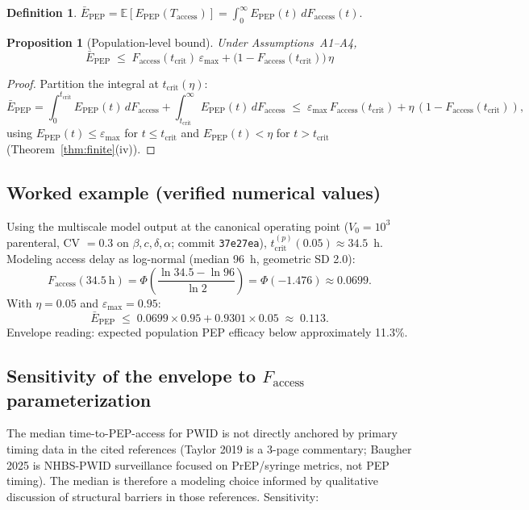 \documentclass[11pt]{article}
\newtheorem{proposition}{Proposition}[section]
\theoremstyle{definition}
\newtheorem{definition}{Definition}[section]
\theoremstyle{remark}
\newcommand{\Epep}{E_{\text{PEP}}}
\newcommand{\Ebarpep}{\bar{E}_{\text{PEP}}}
\newcommand{\Faccess}{F_{\text{access}}}
\newcommand{\tcrit}{t_{\text{crit}}}
\newcommand{\emax}{\varepsilon_{\max}}
\begin{document}
\begin{definition}
$\Ebarpep = \mathbb{E}[\Epep(T_{\text{access}})] = \int_{0}^{\infty} \Epep(t)\,d\Faccess(t)$.
\end{definition}

\begin{proposition}[Population-level bound]\label{prop:bound}
Under Assumptions~A1--A4,
\begin{equation}
\Ebarpep \;\leq\; \Faccess(\tcrit)\,\emax + \big(1 - \Faccess(\tcrit)\big)\,\eta
\label{eq:bound_si}
\end{equation}
\end{proposition}

\begin{proof}
Partition the integral at $\tcrit(\eta)$:
\[
\Ebarpep = \int_{0}^{\tcrit} \Epep(t)\,d\Faccess + \int_{\tcrit}^{\infty} \Epep(t)\,d\Faccess
\;\leq\; \emax\,\Faccess(\tcrit) + \eta\,(1 - \Faccess(\tcrit)),
\]
using $\Epep(t) \leq \emax$ for $t \leq \tcrit$ and $\Epep(t) < \eta$ for $t > \tcrit$ (Theorem~\ref{thm:finite}(iv)).
\end{proof}

\subsection{Worked example (verified numerical values)}

Using the multiscale model output at the canonical operating point ($V_{0} = 10^{3}$ parenteral, CV $= 0.3$ on $\beta, c, \delta, \alpha$; commit \texttt{37e27ea}), $\tcrit^{(p)}(0.05) \approx 34.5$~h. Modeling access delay as log-normal (median 96~h, geometric SD 2.0):
\[
\Faccess(34.5~\text{h}) = \Phi\!\left(\frac{\ln 34.5 - \ln 96}{\ln 2}\right) = \Phi(-1.476) \approx 0.0699.
\]
With $\eta = 0.05$ and $\emax = 0.95$:
\[
\Ebarpep \;\leq\; 0.0699 \times 0.95 + 0.9301 \times 0.05 \;\approx\; 0.113.
\]
Envelope reading: expected population PEP efficacy below approximately 11.3\%.

\subsection{Sensitivity of the envelope to \texorpdfstring{$\Faccess$}{Faccess} parameterization}

The median time-to-PEP-access for PWID is not directly anchored by primary timing data in the cited references (Taylor 2019\cite{taylor2019_si} is a 3-page commentary; Baugher 2025\cite{baugher2025_si} is NHBS-PWID surveillance focused on PrEP/syringe metrics, not PEP timing). The median is therefore a modeling choice informed by qualitative discussion of structural barriers in those references. Sensitivity:
\end{document}
